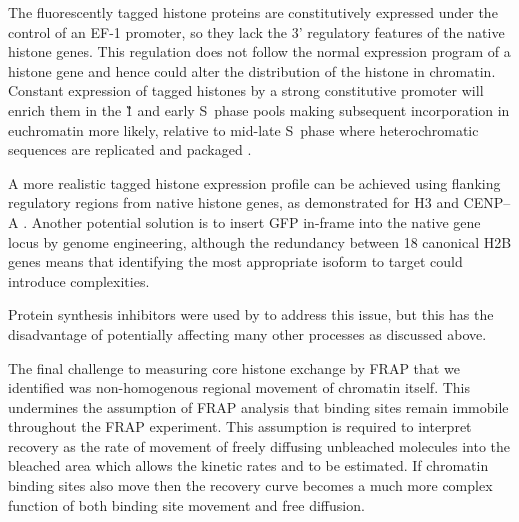    The fluorescently tagged histone proteins are constitutively expressed
    under the control of an EF-1\textalpha{} promoter,
    so they lack the 3' regulatory features of the native histone genes.
    This regulation does not follow the normal
    expression program of a histone gene
    and hence could alter the distribution of the histone in chromatin.
    Constant expression of tagged histones by a strong constitutive promoter
    will enrich them in the \G1{} and early S~phase pools
    making subsequent incorporation in euchromatin more likely,
    relative to mid-late S~phase where heterochromatic sequences
    are replicated and packaged \citep{DNA-replication-timing}.

    A more realistic tagged histone expression profile can be achieved using
    flanking regulatory regions from native histone genes,
    as demonstrated for H3 and CENP--A \citep{pMH3-plasmid,Kevin-pCA-TAG}.
    Another potential solution is to insert GFP
    in-frame into the native gene locus by genome engineering,
    although the redundancy between 18 canonical H2B genes means
    that identifying the most appropriate isoform to target
    could introduce complexities.

    Protein synthesis inhibitors were used by \citet{KimuraCook}
    to address this issue,
    but this has the disadvantage of potentially affecting
    many other processes as discussed above.



    The final challenge to measuring core histone
    exchange by FRAP that we identified
    was non-homogenous regional movement of chromatin itself.
    This undermines the assumption of FRAP analysis that binding sites
    remain immobile throughout the FRAP experiment.
    This assumption is required to interpret recovery
    as the rate of movement of freely diffusing unbleached molecules into the
    bleached area which allows the kinetic
    rates \Kon{} and \Koff{} to be estimated.
    If chromatin binding sites also move then the recovery curve becomes a
    much more complex function of both binding site movement and free diffusion.

